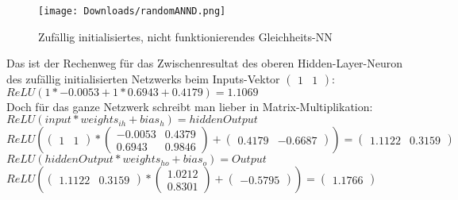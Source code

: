 \documentclass[10pt,a4paper,ngerman,english]{article}
\begin{document}
\begin{figure}[h]
    \begin{center}
        \texttt{[image: Downloads/randomANND.png]}
    \caption{Zufällig initialisiertes, nicht funktionierendes Gleichheits-NN}
    \end{center}    
\end{figure}



Das ist der Rechenweg für das Zwischenresultat des oberen Hidden-Layer-Neuron des zufällig initialisierten Netzwerks beim Inputs-Vektor $\left(\begin{array}{cc} 1 & 1\end{array}\right) $:\\

$ ReLU(1 * -0.0053 + 1 * 0.6943 + 0.4179) = 1.1069 $\\

Doch für das ganze Netzwerk schreibt man lieber in Matrix-Multiplikation:\\

$ ReLU(input * weights_{ih} + bias_h) = hiddenOutput $\\

$ReLU(\left(\begin{array}{cc} 1 & 1\end{array}\right) * \left(\begin{array}{cc} -0.0053 & 0.4379\\ 0.6943 & 0.9846\end{array}\right) + \left(\begin{array}{cc} 0.4179 & -0.6687\end{array}\right)) = \left(\begin{array}{cc} 1.1122 & 0.3159\end{array}\right)$\\

$ ReLU(hiddenOutput * weights_{ho} + bias_o) = Output $\\

$ReLU(\left(\begin{array}{cc} 1.1122 & 0.3159\end{array}\right) * \left(\begin{array}{cc} 1.0212\\ 0.8301\end{array}\right) + \left(\begin{array}{cc} -0.5795\end{array}\right)) = \left(\begin{array}{cc}  1.1766\end{array}\right)$\\
\end{document}
